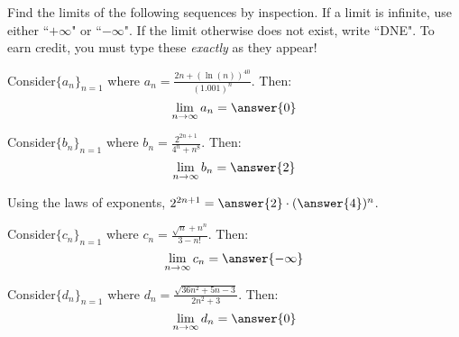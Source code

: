 \documentclass{ximera}
\author{Jim Talamo}
\begin{document}
\begin{exercise}

Find the limits of the following sequences by inspection.  If a limit is infinite, use either ``$+\infty$" or ``$-\infty$".  If the limit otherwise does not exist, write ``DNE".  To earn credit, you must type these \emph{exactly} as they appear!

\begin{exercise}
Consider$\{a_n \}_{n=1}$ where $a_n = \frac{2n+(\ln(n))^{40}}{(1.001)^n}$.  Then:
\[
\lim_{n \to \infty} a_n = \answer{0}
\]
\end{exercise}

\begin{exercise}
Consider$\{b_n \}_{n=1}$ where $b_n = \frac{2^{2n+1}}{4^n+n^8}$.  Then:
\[
\lim_{n \to \infty} b_n = \answer{2}
\]
\begin{hint}
Using the laws of exponents, $2^{2n+1} = \answer{2} \cdot (\answer{4})^n$.
\end{hint}
\end{exercise}

\begin{exercise}
Consider$\{c_n \}_{n=1}$ where $c_n = \frac{\sqrt{n} +n^n}{3-n!}$.  Then:
\[
\lim_{n \to \infty} c_n = \answer{-\infty}
\]
\end{exercise}

\begin{exercise}
Consider$\{d_n \}_{n=1}$ where $d_n = \frac{\sqrt{36n^2+5n-3}}{2n^2+3}$.  Then:
\[
\lim_{n \to \infty} d_n =  \answer{0}
\]
\end{exercise}


\end{exercise}
\end{document}
